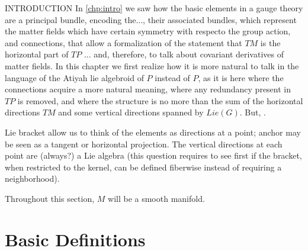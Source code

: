 INTRODUCTION  In \ref{chp:intro} we saw how the basic elements in a gauge theory are a principal bundle, encoding the..., their associated bundles, which represent the matter fields which have certain symmetry with respecto the group action, and connections, that allow a formalization of the statement that $TM$ is the horizontal part of $TP$ ... and, therefore, to talk about covariant derivatives of matter fields. In this chapter we first realize how it is more natural to talk in the language of the Atiyah lie algebroid of $P$ instead of $P$, as it is here where the connections acquire a more natural meaning, where any redundancy present in $TP$ is removed, and where the structure is no more than the sum of the horizontal directions $TM$ and some vertical directions spanned by $Lie(G)$. But, . 

Lie bracket allow us to think of the elements as directions at a point; anchor may be seen as a tangent or horizontal projection. The vertical directions at each point are (always?) a Lie algebra (this question requires to see first if the bracket, when restricted to the kernel, can be defined fiberwise instead of requiring a neighborhood).

Throughout this section, $M$ will be a smooth manifold.

\section{Basic Definitions}

